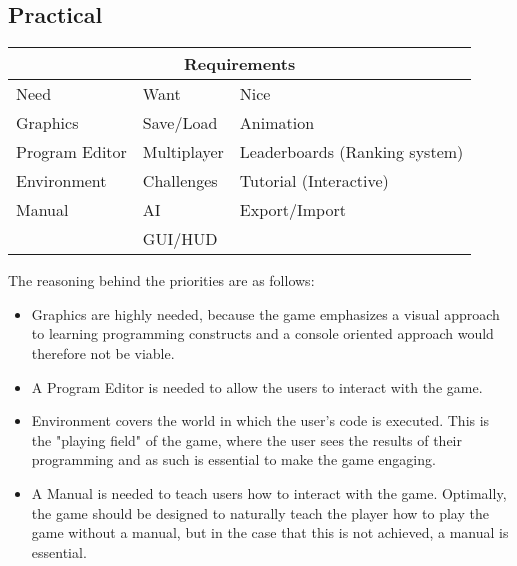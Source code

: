 \subsection*{Practical}
\begin{tabular}{|l|l|l|}
\hline
\multicolumn{3}{|c|}{Requirements}\\
\hline
Need & Want & Nice\\
\hline
Graphics & Save/Load & Animation\\
Program Editor & Multiplayer & Leaderboards (Ranking system)\\
Environment & Challenges & Tutorial (Interactive)\\
Manual & AI & Export/Import\\
 & GUI/HUD & \\
\hline
\end{tabular}

The reasoning behind the priorities are as follows:
\begin{itemize}
\item Graphics are highly needed, because the game emphasizes a visual approach to learning programming constructs and a console oriented approach 
would therefore not be viable.

\item A Program Editor is needed to allow the users to interact with the game.

\item Environment covers the world in which the user's code is executed. This is the "playing field" of the game, where the user sees the results of 
their programming and as such is essential to make the game engaging.

\item A Manual is needed to teach users how to interact with the game. Optimally, the game should be designed to naturally teach the player how to play 
the game without a manual, but in the case that this is not achieved, a manual is essential.
\end{itemize}

